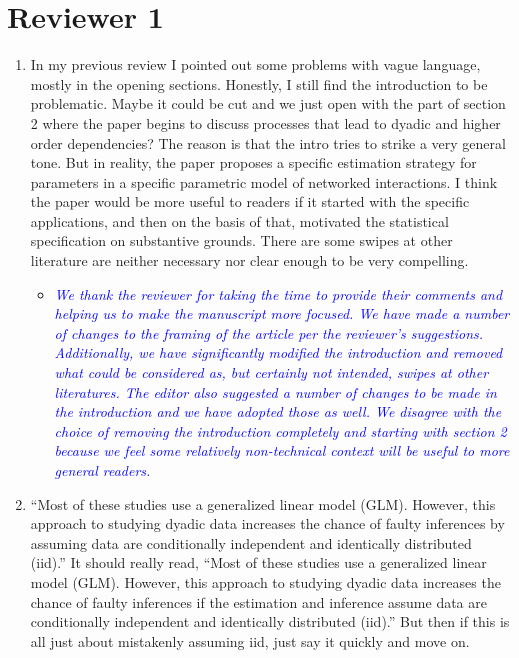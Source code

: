 \section*{Reviewer 1}

\begin{enumerate}
	\item In my previous review I pointed out some problems with vague language, mostly in the opening sections.   Honestly, I still find the introduction to be problematic. Maybe it could be cut and we just open with the part of section 2 where the paper begins to discuss processes that lead to dyadic and higher order dependencies?  The reason is that the intro tries to strike a very general tone.  But in reality, the paper proposes a specific estimation strategy for parameters in a specific parametric model of networked interactions.  I think the paper would be more useful to readers if it started with the specific applications, and then on the basis of that, motivated the statistical specification on substantive grounds.  There are some swipes at other literature are neither necessary nor clear enough to be very compelling.
	\begin{itemize}
		\item \emph{ \textcolor{blue}{
		We thank the reviewer for taking the time to provide their comments and helping us to make the manuscript more focused. We have made a number of changes to the framing of the article per the reviewer's suggestions. Additionally, we have significantly modified the introduction and removed what could be considered as, but certainly not intended, swipes at other literatures. The editor also suggested a number of changes to be made in the introduction and we have adopted those as well. We disagree with the choice of removing the introduction completely and starting with section 2 because we feel some relatively non-technical context will be useful to more general readers.
		}}
	\end{itemize}
	\item ``Most of these studies use a generalized linear model (GLM). However, this approach to studying dyadic data increases the chance of faulty inferences by assuming data are conditionally independent and identically distributed (iid).'' It should really read, ``Most of these studies use a generalized linear model (GLM). However, this approach to studying dyadic data increases the chance of faulty inferences if the estimation and inference assume data are conditionally independent and identically distributed (iid).''  But then if this is all just about mistakenly assuming iid, just say it quickly and move on.

\end{enumerate}
